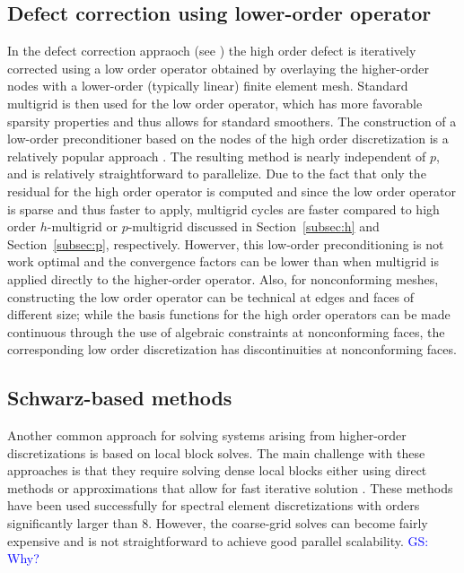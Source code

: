 \documentclass[times]{nlaauth}
\newcommand{\gsnote}[1]{\textcolor{blue}{GS: #1}}
\begin{document}
\subsection{Defect correction using lower-order operator}\label{subsec:low}
In the defect correction appraoch (see
\cite{TrottenbergOosterleeSchuller01}) the high order defect is
iteratively corrected using a low order operator obtained by
overlaying the higher-order nodes with a lower-order (typically
linear) finite element mesh. Standard multigrid is then used for the
low order operator, which has more favorable sparsity properties and
thus allows for standard smoothers.  The construction of a low-order
preconditioner based on the nodes of the high order discretization is
a relatively popular approach \cite{Brown10,Kim07,DevilleMund90}. The
resulting method is nearly independent of $p$, and is relatively
straightforward to parallelize.  Due to the fact that only the
residual for the high order operator is computed and since the low
order operator is sparse and thus faster to apply, multigrid cycles
are faster compared to high order $h$-multigrid or $p$-multigrid
discussed in Section~\ref{subsec:h} and Section~\ref{subsec:p},
respectively. 
Howerver, this low-order preconditioning is not
work optimal and the convergence factors can be lower than when
multigrid is applied directly to the higher-order operator. Also, for
nonconforming meshes, constructing the low order operator can be
technical at edges and faces of different size; while the basis
functions for the high order operators can be made continuous through
the use of algebraic constraints at nonconforming faces, the
corresponding low order discretization has discontinuities at
nonconforming faces.


\subsection{Schwarz-based methods}\label{subsec:schwarz}
Another common approach for solving systems arising from higher-order
discretizations is based on local block solves.  The main challenge
with these approaches is that they require solving dense local blocks
either using direct methods or approximations that allow for fast
iterative solution \cite{LottesFischer05,FischerLottes05}. These
methods have been used successfully for spectral element
discretizations with orders significantly larger than 8. However, the
coarse-grid solves can become fairly expensive and is not
straightforward to achieve good parallel scalability. \gsnote{Why?}
\end{document}
